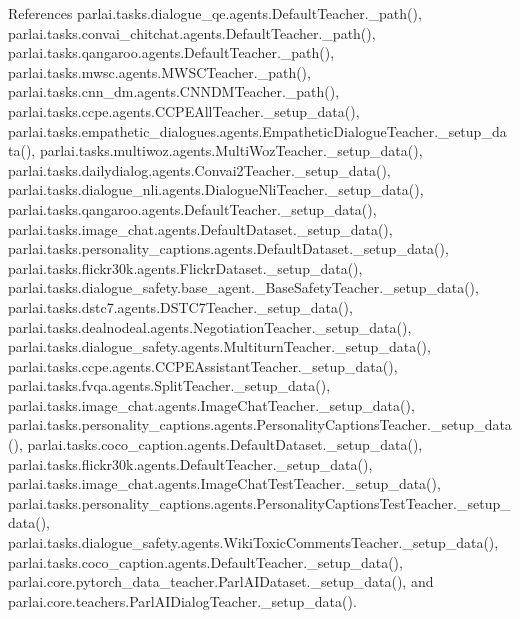 References parlai.\+tasks.\+dialogue\+\_\+qe.\+agents.\+Default\+Teacher.\+\_\+path(), parlai.\+tasks.\+convai\+\_\+chitchat.\+agents.\+Default\+Teacher.\+\_\+path(), parlai.\+tasks.\+qangaroo.\+agents.\+Default\+Teacher.\+\_\+path(), parlai.\+tasks.\+mwsc.\+agents.\+M\+W\+S\+C\+Teacher.\+\_\+path(), parlai.\+tasks.\+cnn\+\_\+dm.\+agents.\+C\+N\+N\+D\+M\+Teacher.\+\_\+path(), parlai.\+tasks.\+ccpe.\+agents.\+C\+C\+P\+E\+All\+Teacher.\+\_\+setup\+\_\+data(), parlai.\+tasks.\+empathetic\+\_\+dialogues.\+agents.\+Empathetic\+Dialogue\+Teacher.\+\_\+setup\+\_\+data(), parlai.\+tasks.\+multiwoz.\+agents.\+Multi\+Woz\+Teacher.\+\_\+setup\+\_\+data(), parlai.\+tasks.\+dailydialog.\+agents.\+Convai2\+Teacher.\+\_\+setup\+\_\+data(), parlai.\+tasks.\+dialogue\+\_\+nli.\+agents.\+Dialogue\+Nli\+Teacher.\+\_\+setup\+\_\+data(), parlai.\+tasks.\+qangaroo.\+agents.\+Default\+Teacher.\+\_\+setup\+\_\+data(), parlai.\+tasks.\+image\+\_\+chat.\+agents.\+Default\+Dataset.\+\_\+setup\+\_\+data(), parlai.\+tasks.\+personality\+\_\+captions.\+agents.\+Default\+Dataset.\+\_\+setup\+\_\+data(), parlai.\+tasks.\+flickr30k.\+agents.\+Flickr\+Dataset.\+\_\+setup\+\_\+data(), parlai.\+tasks.\+dialogue\+\_\+safety.\+base\+\_\+agent.\+\_\+\+Base\+Safety\+Teacher.\+\_\+setup\+\_\+data(), parlai.\+tasks.\+dstc7.\+agents.\+D\+S\+T\+C7\+Teacher.\+\_\+setup\+\_\+data(), parlai.\+tasks.\+dealnodeal.\+agents.\+Negotiation\+Teacher.\+\_\+setup\+\_\+data(), parlai.\+tasks.\+dialogue\+\_\+safety.\+agents.\+Multiturn\+Teacher.\+\_\+setup\+\_\+data(), parlai.\+tasks.\+ccpe.\+agents.\+C\+C\+P\+E\+Assistant\+Teacher.\+\_\+setup\+\_\+data(), parlai.\+tasks.\+fvqa.\+agents.\+Split\+Teacher.\+\_\+setup\+\_\+data(), parlai.\+tasks.\+image\+\_\+chat.\+agents.\+Image\+Chat\+Teacher.\+\_\+setup\+\_\+data(), parlai.\+tasks.\+personality\+\_\+captions.\+agents.\+Personality\+Captions\+Teacher.\+\_\+setup\+\_\+data(), parlai.\+tasks.\+coco\+\_\+caption.\+agents.\+Default\+Dataset.\+\_\+setup\+\_\+data(), parlai.\+tasks.\+flickr30k.\+agents.\+Default\+Teacher.\+\_\+setup\+\_\+data(), parlai.\+tasks.\+image\+\_\+chat.\+agents.\+Image\+Chat\+Test\+Teacher.\+\_\+setup\+\_\+data(), parlai.\+tasks.\+personality\+\_\+captions.\+agents.\+Personality\+Captions\+Test\+Teacher.\+\_\+setup\+\_\+data(), parlai.\+tasks.\+dialogue\+\_\+safety.\+agents.\+Wiki\+Toxic\+Comments\+Teacher.\+\_\+setup\+\_\+data(), parlai.\+tasks.\+coco\+\_\+caption.\+agents.\+Default\+Teacher.\+\_\+setup\+\_\+data(), parlai.\+core.\+pytorch\+\_\+data\+\_\+teacher.\+Parl\+A\+I\+Dataset.\+\_\+setup\+\_\+data(), and parlai.\+core.\+teachers.\+Parl\+A\+I\+Dialog\+Teacher.\+\_\+setup\+\_\+data().

